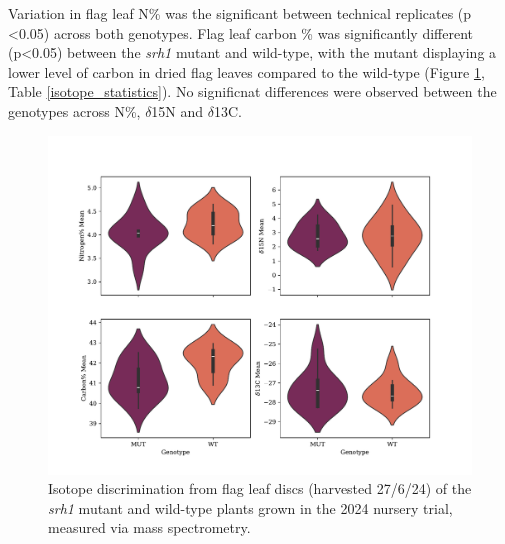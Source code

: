\documentclass{article}
\begin{document}
Variation in flag leaf N\% was the significant between technical replicates
(p \textless0.05) across both genotypes. Flag leaf carbon \% was significantly
different (p\textless0.05) between the \textit{srh1} mutant and wild-type, with the
mutant displaying a lower level of carbon in dried flag leaves compared to
the wild-type (Figure \ref{isotope_combined}, Table \ref{isotope_statistics}).
No significnat differences were observed between the genotypes across N\%,
$\delta$15N and $\delta$13C.

\begin{figure}[ht]
	\centering
	\includegraphics[width=\textwidth]{isotope.pdf}
	\caption{Isotope discrimination from flag leaf discs (harvested 27/6/24)
		of the \textit{srh1} mutant and wild-type plants grown in the 2024 nursery
		trial, measured via mass spectrometry.}
	\label{isotope_combined}
\end{figure}
\end{document}

